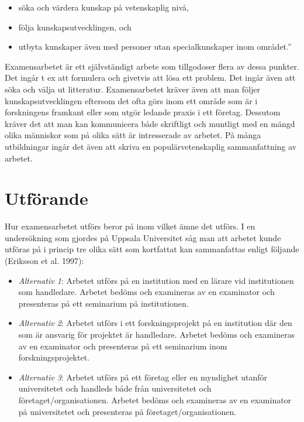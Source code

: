 \begin{itemize}
\item
  söka och värdera kunskap på vetenskaplig nivå,
\item
  följa kunskapsutvecklingen, och
\item
  utbyta kunskaper även med personer utan specialkunskaper inom
  området.''
\end{itemize}

Examensarbetet är ett självständigt arbete som tillgodoser flera av
dessa punkter. Det ingår t ex att formulera och givetvis att lösa ett
problem. Det ingår även att söka och välja ut litteratur. Examensarbetet
kräver även att man följer kunskapsutvecklingen eftersom det ofta görs
inom ett område som är i forskningens framkant eller som utgör ledande
praxis i ett företag. Dessutom kräver det att man kan kommunicera både
skriftligt och muntligt med en mängd olika människor som på olika sätt
är intresserade av arbetet. På många utbildningar ingår det även att
skriva en populärvetenskaplig sammanfattning av arbetet.

\section{Utförande}\label{utfuxf6rande}

Hur examensarbetet utförs beror på inom vilket ämne det utförs. I en
undersökning som gjordes på Uppsala Universitet såg man att arbetet
kunde utföras på i princip tre olika sätt som kortfattat kan
sammanfattas enligt följande (Eriksson et al. 1997):

\begin{itemize}
\item
  \emph{Alternativ 1}: Arbetet utförs på en institution med en lärare
  vid institutionen som handledare. Arbetet bedöms och examineras av en
  examinator och presenteras på ett seminarium på institutionen.
\item
  \emph{Alternativ 2}: Arbetet utförs i ett forskningsprojekt på en
  institution där den som är ansvarig för projektet är handledare.
  Arbetet bedöms och examineras av en examinator och presenteras på ett
  seminarium inom forskningsprojektet.
\item
  \emph{Alternativ 3}: Arbetet utförs på ett företag eller en myndighet
  utanför universitetet och handleds både från universitetet och
  företaget/organisationen. Arbetet bedöms och examineras av en
  examinator på universitetet och presenteras på
  företaget/organisationen.
\end{itemize}

